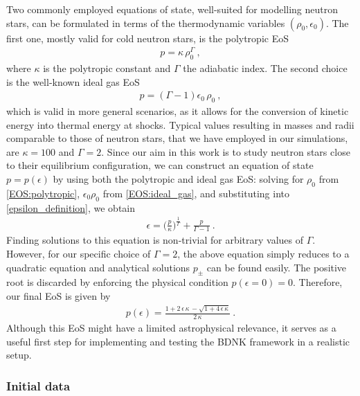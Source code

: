 \documentclass[prd,aps,twocolumn,floats,floatfix,nofootinbib,superscriptaddress] {revtex4-1}
\begin{document}
Two commonly employed equations of state, well-suited for modelling neutron stars, can be formulated in terms of the thermodynamic variables $(\rho_0,\epsilon_0)$. The first one, mostly valid for cold neutron stars, is the polytropic EoS
\begin{align}
p=\kappa \,\rho_0^\Gamma~,
    \label{EOS:polytropic}
\end{align}
where $\kappa$ is the polytropic constant and $\Gamma$ the adiabatic index.  The second choice is the well-known ideal gas EoS
\begin{align}
    p=(\Gamma-1)\epsilon_0\, \rho_0~,
    \label{EOS:ideal_gas}
\end{align}
which is valid in more general scenarios, as it allows for the conversion of kinetic energy into thermal energy at shocks. Typical values resulting in masses and radii comparable to those of neutron stars, that we have employed in our simulations, are $\kappa=100$ and $\Gamma=2.$ 
Since our aim in this work is to study neutron stars close to their equilibrium configuration, we can construct an equation of state $p=p(\epsilon)$ by using both the polytropic and ideal gas EoS:
solving for  $\rho_0$ from \eqref{EOS:polytropic},  $\epsilon_0 \rho_0 $ from \eqref{EOS:ideal_gas}, and substituting into \eqref{epsilon_definition}, we obtain
\begin{align}
    \epsilon = \Big(\frac{p}{\kappa}\Big)^{\frac{1}{\Gamma}} + \frac{p}{\Gamma-1}~.
\end{align}
Finding solutions to this equation is non-trivial for arbitrary values of $\Gamma$.  However, for our specific choice of $\Gamma=2$, the above equation simply reduces to a quadratic equation and analytical solutions $p_{\pm}$ can be found easily.  The positive root is discarded by enforcing the physical condition $p(\epsilon=0)=0$. Therefore, our final EoS is given by
\begin{align}\label{EOS}
    p(\epsilon)=\frac{1+2\,\epsilon \,\kappa\, -\sqrt{1+4\,\epsilon\, \kappa}}{2\, \kappa}~.
\end{align}
Although this EoS might have a limited astrophysical relevance, it serves as a useful first step for implementing and testing the BDNK framework in a realistic setup.

\subsubsection{Initial data }\label{ID}
\end{document}
